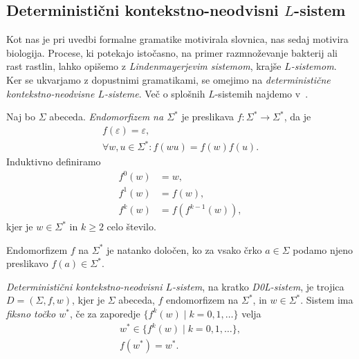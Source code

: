 \documentclass[fin1, tisk]{fmfdelo}
\theoremstyle{definition}
\begin{document}
\subsection[Deterministični kontekstno-neodvisni L-sistem]{Deterministični kontekstno-neodvisni \(L\)-sistem}

Kot nas je pri uvedbi formalne gramatike motivirala slovnica, nas sedaj motivira biologija.
Procese, ki potekajo istočasno, na primer razmnoževanje bakterij ali rast rastlin, lahko opišemo z
\emph{Lindenmayerjevim sistemom}, krajše \emph{$L$-sistemom}. Ker se ukvarjamo z dopustnimi
gramatikami, se omejimo na \emph{deterministične kontekstno-neodvisne $L$-sisteme}. Več o splošnih
$L$-sistemih najdemo v~\cite{RozenbergSalomaa2012}.

\begin{definicija}
    Naj bo $\Sigma$ abeceda. \emph{Endomorfizem na $\Sigma^*$} je preslikava 
    $f \colon \Sigma^* \to \Sigma^* $, da je
    \begin{gather*}
        f(\varepsilon) = \varepsilon, \\
        \forall w, u \in \Sigma^* \colon f(wu) = f(w)f(u).
    \end{gather*}
    Induktivno definiramo
    \begin{align*}
        f^0(w) &= w, \\
        f^1(w) &= f(w), \\
        f^k(w) &= f(f^{k-1}(w)),
    \end{align*}
    kjer je $w \in \Sigma^*$ in $k \geq 2$ celo število.
\end{definicija}

\begin{opomba}
    Endomorfizem $f$ na $\Sigma^*$ je natanko določen, ko za vsako črko $a \in \Sigma$ podamo 
    njeno preslikavo $f(a) \in \Sigma^*$.
\end{opomba}

\begin{definicija}
    \emph{Deterministični kontekstno-neodvisni $L$-sistem}, na kratko \emph{D0L-sistem},
    je trojica $D = (\Sigma, f, w)$, kjer je $\Sigma$ abeceda, $f$ endomorfizem na $\Sigma^*$,
    in $w \in \Sigma^*$. Sistem ima \emph{fiksno točko $ w^* $}, če za zaporedje 
    $\{ f^k(w) \mid k = 0,1, \ldots \}$ velja
    \begin{gather*}
        w^* \in \{ f^k(w) \mid k = 0, 1, \ldots \}, \\
        f(w^*)= w^*.
    \end{gather*}
\end{definicija}
\end{document}
